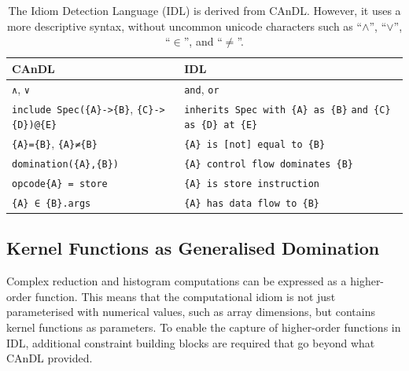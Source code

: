 \begin{table}[H]
    \lstset{keepspaces}
    \centering
    \begin{tabular}{p{}p{}}
        \toprule
        {\bf CAnDL} & {\bf IDL}\\
        \midrule
        {\lstinline[language=CAnDL]!∧!}, {\lstinline[language=CAnDL]!∨!} &
        {\lstinline[language=IDL]!and!}, {\lstinline[language=IDL]!or!} \\
        {\lstinline[language=CAnDL]!include Spec({A}->{B}!}, \vspace{-2.5mm}\newline
        {\phantom{\lstinline[language=CAnDL]!include Spec(!}\lstinline[language=CAnDL]!{C}->{D})@{E}!} &
        {\lstinline[language=IDL]!inherits Spec with {A} as {B}!} \vspace{-2.5mm}\newline
        {\phantom{\lstinline[language=IDL]!inherits Spec!}\hspace{4.4mm}\lstinline[language=IDL]!and {C} as {D} at {E}!}\\
        {\lstinline[language=CAnDL]!{A}={B}!},
        {\lstinline[language=CAnDL]!{A}≠{B}!} &
        {\lstinline[language=IDL]!{A} is [not] equal to {B}!} \\
        {\lstinline[language=CAnDL]!domination({A},{B})!} &
        {\lstinline[language=IDL]!{A} control flow dominates {B}!} \\
        {\lstinline[language=CAnDL]!opcode{A} = store!} &
        {\lstinline[language=IDL]!{A} is store instruction!} \\
        {\lstinline[language=CAnDL]!{A} ∈ {B}.args!} &
        {\lstinline[language=IDL]!{A} has data flow to {B}!} \\
        \bottomrule
    \end{tabular}
    \caption{The Idiom Detection Language (IDL) is derived from CAnDL.
             However, it uses a more descriptive syntax, without uncommon
             unicode characters such as ``$\land$'', ``$\lor$'', ``$\in$'',
             and ``$\neq$''.}
    \label{CanDLtoIDL}
\end{table}

\subsection{Kernel Functions as Generalised Domination}

    Complex reduction and histogram computations can be expressed as a
    higher-order function.
    This means that the computational idiom is not just parameterised with
    numerical values, such as array dimensions, but contains kernel functions
    as parameters.
    To enable the capture of higher-order functions in IDL, additional
    constraint building blocks are required that go beyond what CAnDL
    provided.

